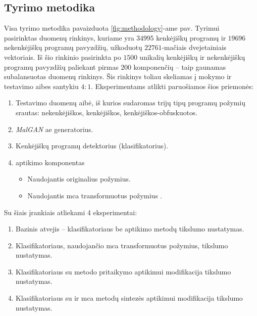 
\subsection{Tyrimo metodika}

Visa tyrimo metodika pavaizduota \ref{fig:methodology}-ame pav. Tyrimui pasirinktas \SLEIPNIR \cite{al-dujailiAdversarialDeepLearning2018} duomenų rinkinys, kuriame yra $34995$ kenkėjiškų programų ir $19696$ nekenkėjiškų programų pavyzdžių, užkoduotų $22761$-mačiais dvejetainiais vektoriais. Iš šio rinkinio pasirinkta po $1500$ unikalių kenkėjiškų ir nekenkėjiškų programų pavyzdžių paliekant pirmas $200$ komponenčių -- taip gaunamas subalansuotas duomenų rinkinys. Šis rinkinys toliau skeliamas į mokymo ir testavimo aibes santykiu $4:1$.
Eksperimentams atlikti paruošiamos šios priemonės:
\begin{enumerate}
    \item Testavimo duomenų aibė, iš kurios sudaromas trijų tipų programų požymių srautas: nekenkėjiškos, kenkėjiškos, kenkėjiškos-obfuskuotos.
    \item \textit{MalGAN} \cite{huGeneratingAdversarialMalware2017} \gls{ae} generatorius.
    \item Kenkėjiškų programų detektorius (klasifikatorius).
    \item {} aptikimo komponentas
    \begin{itemize}
        \item Naudojantis originalius požymius.
        \item Naudojantis \gls{mca} transformuotus požymius .
    \end{itemize}
\end{enumerate}

\noindent
Su šiais įrankiais atliekami 4 eksperimentai:
    \begin{enumerate}
        \item Bazinis atvejis -- klasifikatoriaus be  aptikimo metodų tikslumo nustatymas.
        \item Klasifikatoriaus, naudojančio \gls{mca} transformuotus požymius, tikslumo nustatymas.
        \item Klasifikatoriaus su \LIME metodo pritaikymo  aptikimui modifikacija tikslumo nustatymas.
        \item Klasifikatoriaus su \LIME ir \gls{mca} metodų sintezės  aptikimui modifikacija tikslumo nustatymas.
    \end{enumerate}

